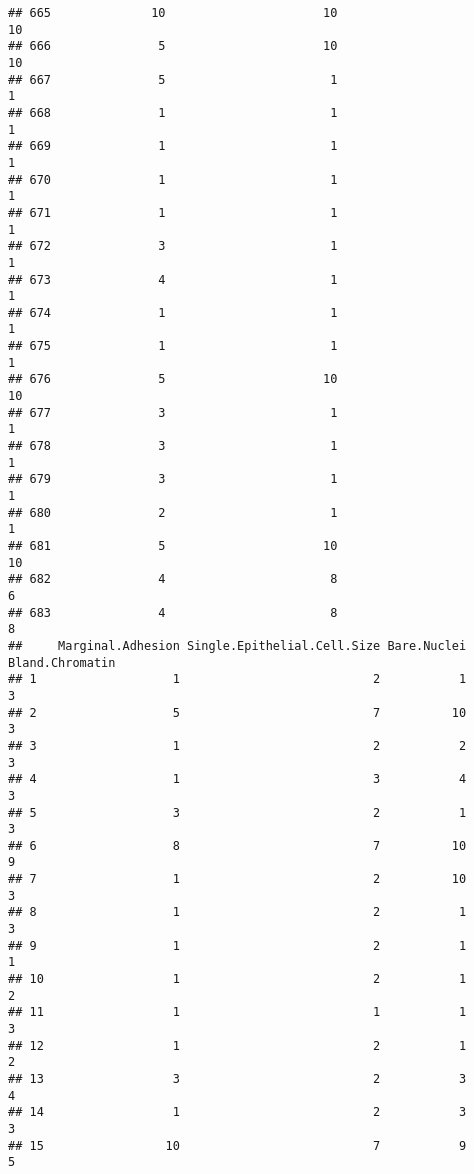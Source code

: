 \documentclass[
]{article}
\begin{document}
\begin{verbatim}
## 665              10                      10                       10
## 666               5                      10                       10
## 667               5                       1                        1
## 668               1                       1                        1
## 669               1                       1                        1
## 670               1                       1                        1
## 671               1                       1                        1
## 672               3                       1                        1
## 673               4                       1                        1
## 674               1                       1                        1
## 675               1                       1                        1
## 676               5                      10                       10
## 677               3                       1                        1
## 678               3                       1                        1
## 679               3                       1                        1
## 680               2                       1                        1
## 681               5                      10                       10
## 682               4                       8                        6
## 683               4                       8                        8
##     Marginal.Adhesion Single.Epithelial.Cell.Size Bare.Nuclei Bland.Chromatin
## 1                   1                           2           1               3
## 2                   5                           7          10               3
## 3                   1                           2           2               3
## 4                   1                           3           4               3
## 5                   3                           2           1               3
## 6                   8                           7          10               9
## 7                   1                           2          10               3
## 8                   1                           2           1               3
## 9                   1                           2           1               1
## 10                  1                           2           1               2
## 11                  1                           1           1               3
## 12                  1                           2           1               2
## 13                  3                           2           3               4
## 14                  1                           2           3               3
## 15                 10                           7           9               5

\end{verbatim}
\end{document}
